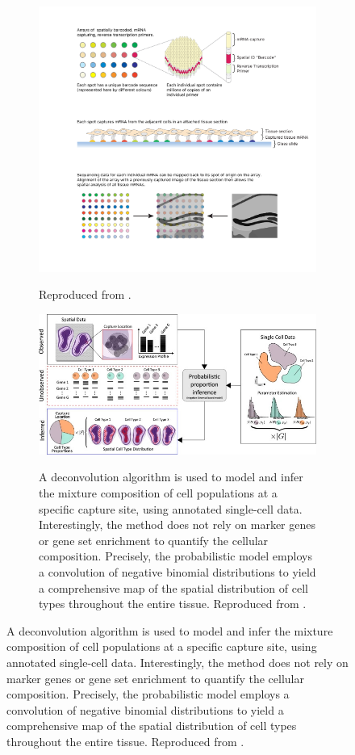 \begin{figure}
\begin{subfigure}[p]{0.45\textwidth}
         \centering
         \includegraphics[width=\textwidth]{figures/biological_introduction/Spatial_transcriptomics_detail.png}
         \label{subfig:spatial-barcoding}
         \caption[\textbf{Zoom on the \textit{spatial barcoding} technique}]{Reproduced from \autocite[Fig. 3]{chell23}.}
     \end{subfigure}
     \vfill
     \begin{subfigure}[p]{0.95\textwidth}
         \centering
         \includegraphics[width=\textwidth]{figures/biological_introduction/sc_deconvolution.jpg}
         \label{subfig:sc-deconvolution}
         \caption[\texttt{stereoscope}\textbf{: A single cell, spatial deconvolution algorithm}]{A deconvolution algorithm is used to model and infer the mixture composition of cell populations at a specific capture site, using annotated single-cell data. Interestingly, the method does not rely on marker genes or gene set enrichment to quantify the cellular composition.  Precisely, the probabilistic model employs a convolution of negative binomial distributions to yield a comprehensive map of the spatial distribution of cell types throughout the entire tissue. Reproduced from \autocite{khozoie_etal21}.}         
         
     \end{subfigure}
\end{figure}

